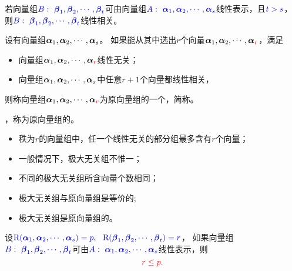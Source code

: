 \begin{frame}
  \begin{dingli}
    若向量组$\textcolor{blue}{B:~\boldsymbol{\beta}_1,\boldsymbol{\beta}_2,\cdots,\boldsymbol{\beta}_t}$可由向量组$\textcolor{blue}{A:~\boldsymbol{\alpha}_1,\boldsymbol{\alpha}_2,\cdots,\boldsymbol{\alpha}_s}$线性表示，且$\textcolor{blue}{t>s}$，
    则$\textcolor{blue}{B:~\boldsymbol{\beta}_1,\boldsymbol{\beta}_2,\cdots,\boldsymbol{\beta}_t}$线性相关。
  \end{dingli}

\end{frame}

\begin{frame}
  \begin{dingyi}
    设有向量组$\boldsymbol{\alpha}_1,\boldsymbol{\alpha}_2,\cdots,\boldsymbol{\alpha}_s$。
    如果能从其中选出$r$个向量$\boldsymbol{\alpha}_1,\boldsymbol{\alpha}_2,\cdots,\boldsymbol{\alpha}_{\textcolor{red}{r}}$，满足
    \begin{itemize}
    \item 向量组$\boldsymbol{\alpha}_1,\boldsymbol{\alpha}_2,\cdots,\boldsymbol{\alpha}_{\textcolor{red}{r}}$线性无关；
    \item 向量组$\boldsymbol{\alpha}_1,\boldsymbol{\alpha}_2,\cdots,\boldsymbol{\alpha}_s$中任意$r+1$个向量都线性相关，
    \end{itemize}
    则称向量组$\boldsymbol{\alpha}_1,\boldsymbol{\alpha}_2,\cdots,\boldsymbol{\alpha}_{\textcolor{red}{r}}$为原向量组的一个，简称。 
    \vspace{0.1in}

    ，称为原向量组的。
  \end{dingyi}
\end{frame}

\begin{frame}
  \begin{zhu}
    \begin{itemize}
    \item   秩为$r$的向量组中，任一个线性无关的部分组最多含有$r$个向量；
    \item 一般情况下，极大无关组不惟一；
    \item 不同的极大无关组所含向量个数相同；
    \item 极大无关组与原向量组是等价的;
    \item 极大无关组是原向量组的。
    \end{itemize}
  \end{zhu}
\end{frame}

\begin{frame}
  \begin{tuilun}
    设$\textcolor{blue}{\mathrm{R}(\boldsymbol{\alpha}_1,\boldsymbol{\alpha}_2,\cdots,\boldsymbol{\alpha}_s)=p,~~\mathrm{R}(\boldsymbol{\beta}_1,\boldsymbol{\beta}_2,\cdots,\boldsymbol{\beta}_t)=r}$，
    如果向量组$\textcolor{blue}{B:~\boldsymbol{\beta}_1,\boldsymbol{\beta}_2,\cdots,\boldsymbol{\beta}_t}$可由$\textcolor{blue}{A:~\boldsymbol{\alpha}_1,\boldsymbol{\alpha}_2,\cdots,\boldsymbol{\alpha}_s}$线性表示，则
    $$\textcolor{red}{r\le p.}$$
  \end{tuilun}

\end{frame}


